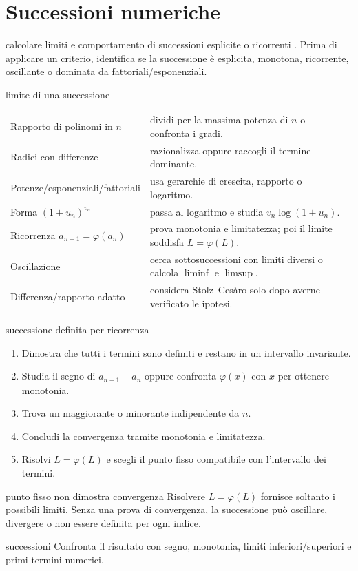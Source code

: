 \chapter{Successioni numeriche}
\label{chap:6}

\begin{obiettivocapitolo}{calcolare limiti e comportamento di successioni esplicite o ricorrenti}
\prioritaalta. Prima di applicare un criterio, identifica se la successione è esplicita, monotona, ricorrente, oscillante o dominata da fattoriali/esponenziali.
\end{obiettivocapitolo}
\begin{sceltametodo}{limite di una successione}
\begin{tabularx}{\textwidth}{@{}p{}X@{}}
Rapporto di polinomi in $n$ & dividi per la massima potenza di $n$ o confronta i gradi.\\
Radici con differenze & razionalizza oppure raccogli il termine dominante.\\
Potenze/esponenziali/fattoriali & usa gerarchie di crescita, rapporto o logaritmo.\\
Forma $(1+u_n)^{v_n}$ & passa al logaritmo e studia $v_n\log(1+u_n)$.\\
Ricorrenza $a_{n+1}=\varphi(a_n)$ & prova monotonia e limitatezza; poi il limite soddisfa $L=\varphi(L)$.\\
Oscillazione & cerca sottosuccessioni con limiti diversi o calcola $\liminf$ e $\limsup$.\\
Differenza/rapporto adatto & considera Stolz--Cesàro solo dopo averne verificato le ipotesi.
\end{tabularx}
\end{sceltametodo}
\begin{proceduraesame}{successione definita per ricorrenza}
\begin{enumerate}
\item Dimostra che tutti i termini sono definiti e restano in un intervallo invariante.
\item Studia il segno di $a_{n+1}-a_n$ oppure confronta $\varphi(x)$ con $x$ per ottenere monotonia.
\item Trova un maggiorante o minorante indipendente da $n$.
\item Concludi la convergenza tramite monotonia e limitatezza.
\item Risolvi $L=\varphi(L)$ e scegli il punto fisso compatibile con l'intervallo dei termini.
\end{enumerate}
\end{proceduraesame}
\begin{errorefrequente}{punto fisso non dimostra convergenza}
Risolvere $L=\varphi(L)$ fornisce soltanto i possibili limiti. Senza una prova di convergenza, la successione può oscillare, divergere o non essere definita per ogni indice.
\end{errorefrequente}
\begin{controllofinale}{successioni}
Confronta il risultato con segno, monotonia, limiti inferiori/superiori e primi termini numerici.
\end{controllofinale}

